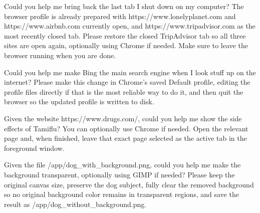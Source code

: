 \documentclass{llmxive}
\begin{document}
\begin{instructionbox}
Could you help me bring back the last tab I shut down on my computer? The browser profile is already prepared with \textasciigrave{}https://www.lonelyplanet.com\textasciigrave{} and \textasciigrave{}https://www.airbnb.com\textasciigrave{} currently open, and \textasciigrave{}https://www.tripadvisor.com\textasciigrave{} as the most recently closed tab. Please restore the closed TripAdvisor tab so all three sites are open again, optionally using Chrome if needed. Make sure to leave the browser running when you are done.
\end{instructionbox}

\begin{instructionbox}
Could you help me make Bing the main search engine when I look stuff up on the internet? Please make this change in Chrome's saved Default profile, editing the profile files directly if that is the most reliable way to do it, and then quit the browser so the updated profile is written to disk.
\end{instructionbox}

\begin{instructionbox}
Given the website \textasciigrave{}https://www.drugs.com/\textasciigrave{}, could you help me show the side effects of Tamiflu? You can optionally use Chrome if needed. Open the relevant page and, when finished, leave that exact page selected as the active tab in the foreground window.
\end{instructionbox}

\begin{instructionbox}
Given the file \textasciigrave{}/app/dog\_with\_background.png\textasciigrave{}, could you help me make the background transparent, optionally using GIMP if needed? Please keep the original canvas size, preserve the dog subject, fully clear the removed background so no original background color remains in transparent regions, and save the result as \textasciigrave{}/app/dog\_without\_background.png\textasciigrave{}.
\end{instructionbox}
\end{document}

